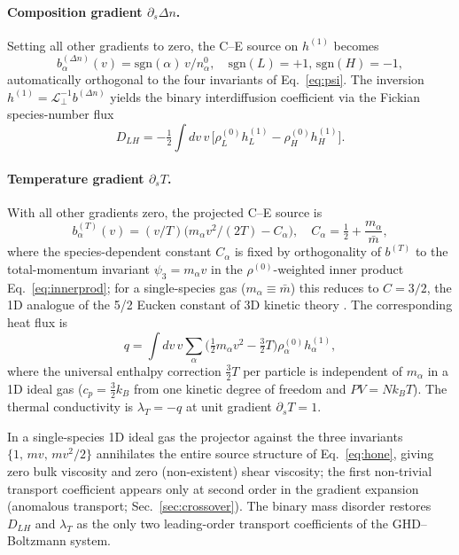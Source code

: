 \documentclass[aps,pre,twocolumn,superscriptaddress,longbibliography,floatfix]{revtex4-2}
\begin{document}
\paragraph*{Composition gradient $\partial_s\Delta n$.}
Setting all other gradients to zero, the C--E source on
$h^{(1)}$ becomes
\begin{equation}
b_\alpha^{(\Delta n)}(v) = \mathrm{sgn}(\alpha)\,v/n_\alpha^0,
\quad
\mathrm{sgn}(L)=+1,\,\mathrm{sgn}(H)=-1,
\label{eq:bDn}
\end{equation}
automatically orthogonal to the four invariants of
Eq.~\eqref{eq:psi}. The inversion
$h^{(1)}=\mathcal{L}^{-1}_\perp b^{(\Delta n)}$ yields the
binary interdiffusion coefficient via the Fickian
species-number flux
\begin{equation}
D_{LH} = -\tfrac12\!\int\!dv\,v\,
\bigl[\rho_L^{(0)}h_L^{(1)} - \rho_H^{(0)}h_H^{(1)}\bigr].
\label{eq:Dnum}
\end{equation}

\paragraph*{Temperature gradient $\partial_s T$.}
With all other gradients zero, the projected C--E source is
\begin{equation}
b_\alpha^{(T)}(v) = (v/T)\bigl(m_\alpha v^2/(2T) - C_\alpha\bigr),
\quad
C_\alpha = \tfrac12 + \frac{m_\alpha}{\bar m},
\label{eq:bT}
\end{equation}
where the species-dependent constant $C_\alpha$ is fixed by
orthogonality of $b^{(T)}$ to the total-momentum invariant
$\psi_3=m_\alpha v$ in the $\rho^{(0)}$-weighted inner
product Eq.~\eqref{eq:innerprod}; for a single-species gas
($m_\alpha\equiv \bar m$) this reduces to $C=3/2$, the 1D
analogue of the 5/2 Eucken constant of 3D kinetic theory
\cite{ChapmanCowling}.
The corresponding heat flux is
\begin{equation}
q = \!\int\!dv\,v
\sum_\alpha\bigl(\tfrac12 m_\alpha v^2 - \tfrac32 T\bigr)
\rho_\alpha^{(0)}h_\alpha^{(1)},
\label{eq:qT}
\end{equation}
where the universal enthalpy correction $\tfrac32 T$ per
particle is independent of $m_\alpha$ in a 1D ideal gas
($c_p=\tfrac32 k_B$ from one kinetic degree of freedom and
$PV=Nk_BT$). The thermal conductivity is
$\lambda_T = -q$ at unit gradient $\partial_s T=1$.

In a single-species 1D ideal gas the projector against the
three invariants $\{1,\,mv,\,mv^2/2\}$ annihilates the entire
source structure of Eq.~\eqref{eq:hone}, giving zero bulk
viscosity and zero (non-existent) shear viscosity; the
first non-trivial transport coefficient appears only at
second order in the gradient expansion (anomalous transport;
Sec.~\ref{sec:crossover}). The binary mass disorder
restores $D_{LH}$ and $\lambda_T$ as the only two leading-order
transport coefficients of the GHD--Boltzmann system.
\end{document}
